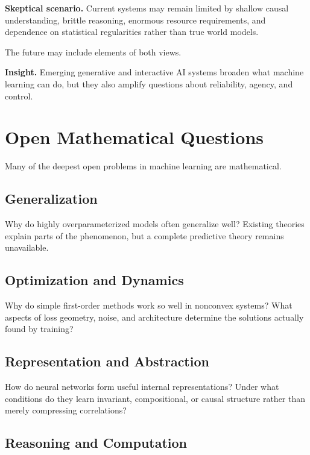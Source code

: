 \medskip

\noindent
\textbf{Skeptical scenario.}
Current systems may remain limited by shallow causal understanding, brittle reasoning, enormous resource requirements, and dependence on statistical regularities rather than true world models.

\medskip

\noindent
The future may include elements of both views.

\medskip

\noindent
\textbf{Insight.}
Emerging generative and interactive AI systems broaden what machine learning can do, but they also amplify questions about reliability, agency, and control.

\section{Open Mathematical Questions}

Many of the deepest open problems in machine learning are mathematical.

\subsection{Generalization}

Why do highly overparameterized models often generalize well? Existing theories explain parts of the phenomenon, but a complete predictive theory remains unavailable.

\subsection{Optimization and Dynamics}

Why do simple first-order methods work so well in nonconvex systems? What aspects of loss geometry, noise, and architecture determine the solutions actually found by training?

\subsection{Representation and Abstraction}

How do neural networks form useful internal representations? Under what conditions do they learn invariant, compositional, or causal structure rather than merely compressing correlations?

\subsection{Reasoning and Computation}

